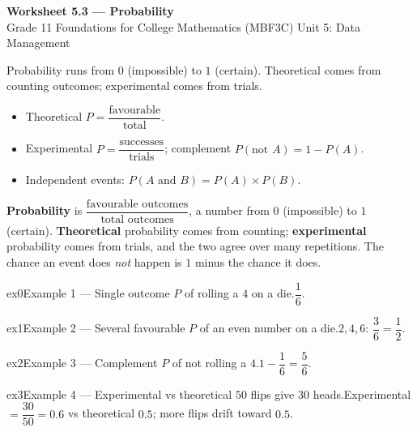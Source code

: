 \documentclass[11pt]{article}
\begin{document}
\begin{center}
{\LARGE\bfseries\color{titleblue}Worksheet 5.3 --- Probability}\\[2pt]
{\small Grade 11 Foundations for College Mathematics (MBF3C) \textperiodcentered{} Unit 5: Data Management}
\end{center}

\begin{ideabox}
Probability runs from $0$ (impossible) to $1$ (certain). Theoretical comes from counting outcomes; experimental comes from trials.
\begin{itemize}[leftmargin=*,itemsep=2pt]
  \item Theoretical $P=\dfrac{\text{favourable}}{\text{total}}$.
  \item Experimental $P=\dfrac{\text{successes}}{\text{trials}}$; complement $P(\text{not }A)=1-P(A)$.
  \item Independent events: $P(A\text{ and }B)=P(A)\times P(B)$.
\end{itemize}
\end{ideabox}

\begin{learnbox}
\textbf{Probability} is $\dfrac{\text{favourable outcomes}}{\text{total outcomes}}$, a number from $0$ (impossible) to $1$ (certain).
\textbf{Theoretical} probability comes from counting; \textbf{experimental} probability comes from trials, and the two agree over many repetitions.
The chance an event does \emph{not} happen is $1$ minus the chance it does.
\end{learnbox}


\begin{example}{ex0}{Example 1 --- Single outcome}
$P$ of rolling a $4$ on a die.\soln $\dfrac16$.
\end{example}

\begin{example}{ex1}{Example 2 --- Several favourable}
$P$ of an even number on a die.\soln $2,4,6$: $\dfrac36=\dfrac12$.
\end{example}

\begin{example}{ex2}{Example 3 --- Complement}
$P$ of not rolling a $4$.\soln $1-\dfrac16=\dfrac56$.
\end{example}

\begin{example}{ex3}{Example 4 --- Experimental vs theoretical}
$50$ flips give $30$ heads.\soln Experimental $=\dfrac{30}{50}=0.6$ vs theoretical $0.5$; more flips drift toward $0.5$.
\end{example}
\end{document}
